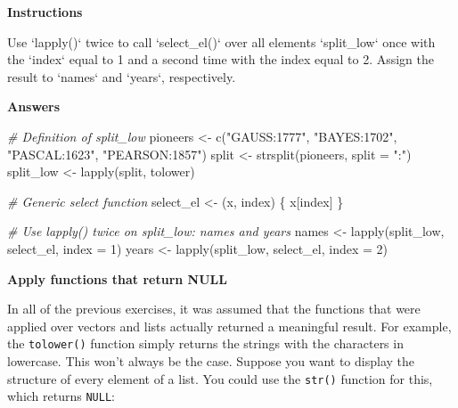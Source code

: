 \documentclass[]{article}
\newcommand{\hlnum}[1]{\textcolor[rgb]{0.816,0.125,0.439}{#1}}%
\newcommand{\hlstr}[1]{\textcolor[rgb]{0.251,0.627,0.251}{#1}}%
\newcommand{\hlcom}[1]{\textcolor[rgb]{0.502,0.502,0.502}{\textit{#1}}}%
\newcommand{\hlstd}[1]{\textcolor[rgb]{0.251,0.251,0.251}{#1}}%
\newcommand{\hlkwc}[1]{\textcolor[rgb]{0.251,0.251,0.251}{#1}}%
\newcommand{\hlkwd}[1]{\textcolor[rgb]{0.878,0.439,0.125}{#1}}%
\newenvironment{Shaded}{\begin{myshaded}}{\end{myshaded}}
\newcommand{\KeywordTok}[1]{\hlkwd{#1}}
\newcommand{\DataTypeTok}[1]{\hlkwc{#1}}
\newcommand{\DecValTok}[1]{\hlnum{#1}}
\newcommand{\StringTok}[1]{\hlstr{#1}}
\newcommand{\CommentTok}[1]{\hlcom{#1}}
\newcommand{\NormalTok}[1]{\hlstd{#1}}
\begin{document}
\textbf{Instructions}

\begin{Shaded}
\begin{Highlighting}[]
\NormalTok{Use }\StringTok{`}\DataTypeTok{lapply()}\StringTok{`}\NormalTok{ twice to call }\StringTok{`}\DataTypeTok{select_el()}\StringTok{`}\NormalTok{ over all elements } \StringTok{`}\DataTypeTok{split_low}\StringTok{`}\OperatorTok{:}\StringTok{ }\NormalTok{once with the }\StringTok{`}\DataTypeTok{index}\StringTok{`}\NormalTok{ equal to }\DecValTok{1}\NormalTok{ and a second time with the index equal to }\DecValTok{2}\NormalTok{. Assign the result to }\StringTok{`}\DataTypeTok{names}\StringTok{`}\NormalTok{ and }\StringTok{`}\DataTypeTok{years}\StringTok{`}\NormalTok{, respectively.}
\end{Highlighting}
\end{Shaded}

\textbf{Answers}

\begin{Shaded}
\begin{Highlighting}[]
\CommentTok{# Definition of split_low}
\NormalTok{pioneers <-}\StringTok{ }\KeywordTok{c}\NormalTok{(}\StringTok{"GAUSS:1777"}\NormalTok{, }\StringTok{"BAYES:1702"}\NormalTok{, }\StringTok{"PASCAL:1623"}\NormalTok{, }\StringTok{"PEARSON:1857"}\NormalTok{)}
\NormalTok{split <-}\StringTok{ }\KeywordTok{strsplit}\NormalTok{(pioneers, }\DataTypeTok{split =} \StringTok{":"}\NormalTok{)}
\NormalTok{split_low <-}\StringTok{ }\KeywordTok{lapply}\NormalTok{(split, tolower)}

\CommentTok{# Generic select function}
\NormalTok{select_el <-}\StringTok{ }\NormalTok{(x, index) \{}
\NormalTok{  x[index]}
\NormalTok{\}}

\CommentTok{# Use lapply() twice on split_low: names and years}
\NormalTok{names <-}\StringTok{ }\KeywordTok{lapply}\NormalTok{(split_low, select_el, }\DataTypeTok{index =} \DecValTok{1}\NormalTok{)}
\NormalTok{years <-}\StringTok{ }\KeywordTok{lapply}\NormalTok{(split_low, select_el, }\DataTypeTok{index =} \DecValTok{2}\NormalTok{)}
\end{Highlighting}
\end{Shaded}

\textbf{Apply functions that return NULL}

In all of the previous exercises, it was assumed that the functions that
were applied over vectors and lists actually returned a meaningful
result. For example, the \texttt{tolower()} function simply returns the
strings with the characters in lowercase. This won't always be the case.
Suppose you want to display the structure of every element of a list.
You could use the \texttt{str()} function for this, which returns
\texttt{NULL}:
\end{document}
